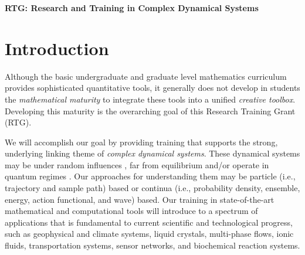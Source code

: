 \documentclass[11pt]{NSFamsart}
\begin{document}
  

 

\centerline{\large \textbf{RTG: Research and Training in Complex Dynamical Systems}}


\section{Introduction}

Although the basic undergraduate and graduate level mathematics curriculum provides sophisticated quantitative tools, it generally does not develop in students the \emph{mathematical maturity} to integrate these tools into a unified \emph{creative toolbox}. Developing this maturity is the overarching goal of this Research Training Grant (RTG).  

We will accomplish our goal by providing training that supports the strong, underlying linking theme of \emph{complex dynamical systems}.  These dynamical systems may be under random influences \cite{Arnold, DuanBook2015}, far from equilibrium \cite{liu2009introduction} and/or operate in quantum regimes \cite{Dittrich2016}. Our approaches for understanding them may be particle (i.e., trajectory and sample path) based or continua (i.e., probability density, ensemble, energy, action functional, and wave) based.  Our training in state-of-the-art mathematical and computational tools will introduce to a spectrum of applications that is fundamental to current scientific and technological progress, such as geophysical and climate systems, liquid crystals, multi-phase flows, ionic fluids,  transportation systems, sensor networks, and biochemical reaction systems. 
\end{document}
